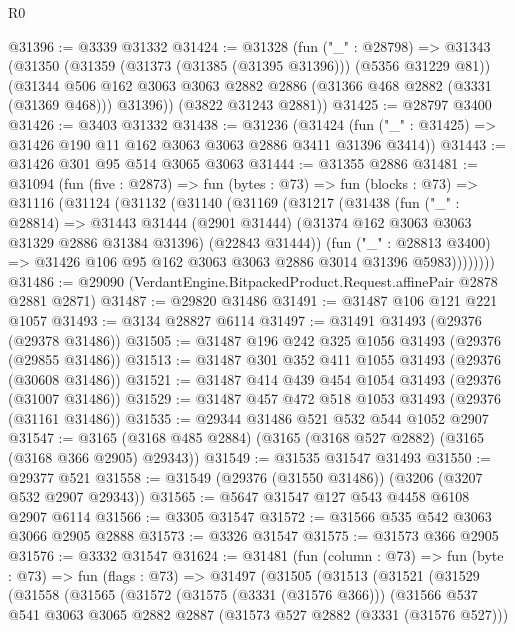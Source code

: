\begin{lexlean}{R0}
\begin{coremodule}
@31396 := @3339 @31332
@31424 := @31328
    (fun ("_" : @28798) =>
    @31343
      (@31350
        (@31359 (@31373 (@31385 (@31395 @31396))) (@5356 @31229 @81))
        (@31344 @506 @162 @3063 @3063 @2882 @2886 (@31366 @468 @2882 (@3331 (@31369 @468))) @31396))
      (@3822 @31243 @2881))
@31425 := @28797 @3400
@31426 := @3403 @31332
@31438 := @31236
    (@31424 (fun ("_" : @31425) => @31426 @190 @11 @162 @3063 @3063 @2886 @3411 @31396 @3414))
@31443 := @31426 @301 @95 @514 @3065 @3063
@31444 := @31355 @2886
@31481 := @31094
    (fun (five : @2873) =>
    fun (bytes : @73) =>
    fun (blocks : @73) =>
    @31116
      (@31124
        (@31132
          (@31140
            (@31169
              (@31217
                (@31438
                  (fun ("_" : @28814) =>
                  @31443
                    @31444
                    (@2901 @31444)
                    (@31374 @162 @3063 @3063 @31329 @2886 @31384 @31396)
                    (@22843 @31444))
                  (fun ("_" : @28813 @3400) =>
                  @31426 @106 @95 @162 @3063 @3063 @2886 @3014 @31396 @5983))))))))
@31486 := @29090 (VerdantEngine.BitpackedProduct.Request.affinePair @2878 @2881 @2871)
@31487 := @29820 @31486
@31491 := @31487 @106 @121 @221 @1057
@31493 := @3134 @28827 @6114
@31497 := @31491 @31493 (@29376 (@29378 @31486))
@31505 := @31487 @196 @242 @325 @1056 @31493 (@29376 (@29855 @31486))
@31513 := @31487 @301 @352 @411 @1055 @31493 (@29376 (@30608 @31486))
@31521 := @31487 @414 @439 @454 @1054 @31493 (@29376 (@31007 @31486))
@31529 := @31487 @457 @472 @518 @1053 @31493 (@29376 (@31161 @31486))
@31535 := @29344 @31486 @521 @532 @544 @1052 @2907
@31547 := @3165 (@3168 @485 @2884) (@3165 (@3168 @527 @2882) (@3165 (@3168 @366 @2905) @29343))
@31549 := @31535 @31547 @31493
@31550 := @29377 @521
@31558 := @31549 (@29376 (@31550 @31486)) (@3206 (@3207 @532 @2907 @29343))
@31565 := @5647 @31547 @127 @543 @4458 @6108 @2907 @6114
@31566 := @3305 @31547
@31572 := @31566 @535 @542 @3063 @3066 @2905 @2888
@31573 := @3326 @31547
@31575 := @31573 @366 @2905
@31576 := @3332 @31547
@31624 := @31481
    (fun (column : @73) =>
    fun (byte : @73) =>
    fun (flags : @73) =>
    @31497
      (@31505
        (@31513
          (@31521
            (@31529
              (@31558
                (@31565
                  (@31572
                    (@31575 (@3331 (@31576 @366)))
                    (@31566
                      @537
                      @541
                      @3063
                      @3065
                      @2882
                      @2887
                      (@31573 @527 @2882 (@3331 (@31576 @527)))

\end{coremodule}
\end{lexlean}
